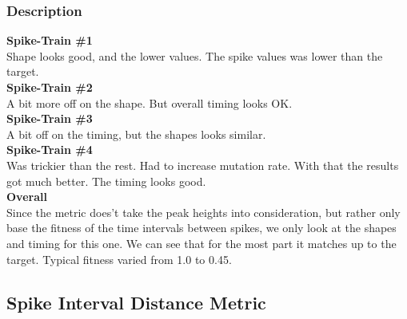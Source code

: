 \subsubsection{Description}

\textbf{Spike-Train \#1} \\
Shape looks good, and the lower values. The spike values was lower than the target.   \\

\textbf{Spike-Train \#2} \\
A bit more off on the shape. But overall timing looks OK.  \\

\textbf{Spike-Train \#3} \\
A bit off on the timing, but the shapes looks similar.  \\

\textbf{Spike-Train \#4} \\
Was trickier than the rest. Had to increase mutation rate. With that the results got much better. The timing looks good.  \\

\textbf{Overall} \\
Since the metric does't take the peak heights into consideration, but rather only base the fitness of the time intervals between spikes, we only look at the shapes and timing for this
one. We can see that for the most part it matches up to the target. Typical fitness varied from 1.0 to 0.45. 





\subsection{Spike Interval Distance Metric}

